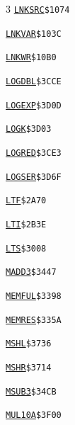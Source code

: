 \begin{multicols}{3}
\noindent\hyperlink{l:LNKSRC}{\texttt{LNKSRC}}\hfill\texttt{\$1074~\phantom{000}\llap{\pageref{l:LNKSRC}}}\par
\noindent\hyperlink{l:LNKVAR}{\texttt{LNKVAR}}\hfill\texttt{\$103C~\phantom{000}\llap{\pageref{l:LNKVAR}}}\par
\noindent\hyperlink{l:LNKWR}{\texttt{LNKWR}}\hfill\texttt{\$10B0~\phantom{000}\llap{\pageref{l:LNKWR}}}\par
\noindent\hyperlink{l:LOGDBL}{\texttt{LOGDBL}}\hfill\texttt{\$3CCE~\phantom{000}\llap{\pageref{l:LOGDBL}}}\par
\noindent\hyperlink{l:LOGEXP}{\texttt{LOGEXP}}\hfill\texttt{\$3D0D~\phantom{000}\llap{\pageref{l:LOGEXP}}}\par
\noindent\hyperlink{l:LOGK}{\texttt{LOGK}}\hfill\texttt{\$3D03~\phantom{000}\llap{\pageref{l:LOGK}}}\par
\noindent\hyperlink{l:LOGRED}{\texttt{LOGRED}}\hfill\texttt{\$3CE3~\phantom{000}\llap{\pageref{l:LOGRED}}}\par
\noindent\hyperlink{l:LOGSER}{\texttt{LOGSER}}\hfill\texttt{\$3D6F~\phantom{000}\llap{\pageref{l:LOGSER}}}\par
\noindent\hyperlink{l:LTF}{\texttt{LTF}}\hfill\texttt{\$2A70~\phantom{000}\llap{\pageref{l:LTF}}}\par
\noindent\hyperlink{l:LTI}{\texttt{LTI}}\hfill\texttt{\$2B3E~\phantom{000}\llap{\pageref{l:LTI}}}\par
\noindent\hyperlink{l:LTS}{\texttt{LTS}}\hfill\texttt{\$3008~\phantom{000}\llap{\pageref{l:LTS}}}\par
\noindent\hyperlink{l:MADD3}{\texttt{MADD3}}\hfill\texttt{\$3447~\phantom{000}\llap{\pageref{l:MADD3}}}\par
\noindent\hyperlink{l:MEMFUL}{\texttt{MEMFUL}}\hfill\texttt{\$3398~\phantom{000}\llap{\pageref{l:MEMFUL}}}\par
\noindent\hyperlink{l:MEMRES}{\texttt{MEMRES}}\hfill\texttt{\$335A~\phantom{000}\llap{\pageref{l:MEMRES}}}\par
\noindent\hyperlink{l:MSHL}{\texttt{MSHL}}\hfill\texttt{\$3736~\phantom{000}\llap{\pageref{l:MSHL}}}\par
\noindent\hyperlink{l:MSHR}{\texttt{MSHR}}\hfill\texttt{\$3714~\phantom{000}\llap{\pageref{l:MSHR}}}\par
\noindent\hyperlink{l:MSUB3}{\texttt{MSUB3}}\hfill\texttt{\$34CB~\phantom{000}\llap{\pageref{l:MSUB3}}}\par
\noindent\hyperlink{l:MUL10A}{\texttt{MUL10A}}\hfill\texttt{\$3F00~\phantom{000}\llap{\pageref{l:MUL10A}}}\par

\end{multicols}
